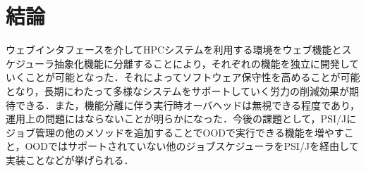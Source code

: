 \documentclass[a4paper,oneside,twocolumn,notitlepage,dvipdfmx]{jsarticle}
\begin{document}
\section{結論}
ウェブインタフェースを介してHPCシステムを利用する環境をウェブ機能とスケジューラ抽象化機能に分離することにより，それぞれの機能を独立に開発していくことが可能となった．それによってソフトウェア保守性を高めることが可能となり，長期にわたって多様なシステムをサポートしていく労力の削減効果が期待できる．また，機能分離に伴う実行時オーバヘッドは無視できる程度であり，運用上の問題にはならないことが明らかになった．今後の課題として，PSI/Jにジョブ管理の他のメソッドを追加することでOODで実行できる機能を増やすこと，OODではサポートされていない他のジョブスケジューラをPSI/Jを経由して実装ことなどが挙げられる．\par





\end{document}
